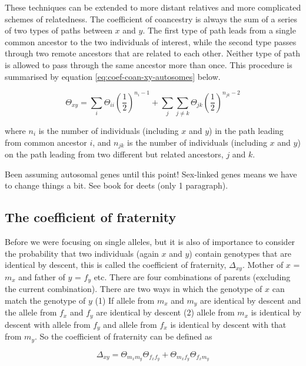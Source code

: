 \documentclass[
]{book}
\begin{document}
These techniques can be extended to more distant relatives and more complicated schemes of relatedness. The coefficient of coancestry is always the sum of a series of two types of paths between \(x\) and \(y\). The first type of path leads from a single common ancestor to the two individuals of interest, while the second type passes through two remote ancestors that are related to each other. Neither type of path is allowed to pass through the same ancestor more than once. This procedure is summarised by equation \eqref{eq:coef-coan-xy-autosomes} below.

\begin{equation}
  \Theta_{xy} = \sum_{i}\Theta_{ii}(\frac{1}{2})^{n_i - 1} + \sum_{j}\sum_{j \ne k}\Theta_{jk}(\frac{1}{2})^{n_{jk} - 2}
  \label{eq:coef-coan-xy-autosomes}
\end{equation}

where \(n_i\) is the number of individuals (including \(x\) and \(y\)) in the path leading from common ancestor \(i\), and \(n_{jk}\) is the number of individuals (including \(x\) and \(y\)) on the path leading from two different but related ancestors, \(j\) and \(k\).

Been assuming autosomal genes until this point! Sex-linked genes means we have to change things a bit. See book for deets (only 1 paragraph).

\hypertarget{the-coefficient-of-fraternity}{%
\subsection{The coefficient of fraternity}\label{the-coefficient-of-fraternity}}

Before we were focusing on single alleles, but it is also of importance to consider the probability that two individuals (again \(x\) and \(y\)) contain genotypes that are identical by descent, this is called the coefficient of fraternity, \(\Delta_{xy}\). Mother of \(x\) = \(m_x\) and father of \(y\) = \(f_y\) etc. There are four combinations of parents (excluding the current combination). There are two ways in which the genotype of \(x\) can match the genotype of \(y\) (1) If allele from \(m_x\) and \(m_y\) are identical by descent and the allele from \(f_x\) and \(f_y\) are identical by descent (2) allele from \(m_x\) is identical by descent with allele from \(f_y\) and allele from \(f_x\) is identical by descent with that from \(m_y\). So the coefficient of fraternity can be defined as

\begin{equation}
  \Delta_{xy} = \Theta_{m_{x}m_{y}}\Theta_{f_{x}f_{y}} + \Theta_{m_{x}f_{y}}\Theta_{f_{x}m_{y}}
  \label{eq:coef-frat}
\end{equation}
\end{document}
